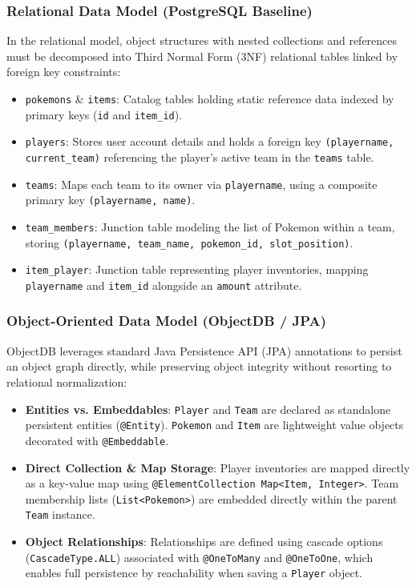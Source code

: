 \documentclass{article}
\begin{document}
\subsubsection{Relational Data Model (PostgreSQL Baseline)}
In the relational model, object structures with nested collections and references must be decomposed into Third Normal Form (3NF) relational tables linked by foreign key constraints:
\begin{itemize}
    \item \texttt{pokemons} \& \texttt{items}: Catalog tables holding static reference data indexed by primary keys (\texttt{id} and \texttt{item\_id}).
    \item \texttt{players}: Stores user account details and holds a foreign key \texttt{(playername, current\_team)} referencing the player's active team in the \texttt{teams} table.
    \item \texttt{teams}: Maps each team to its owner via \texttt{playername}, using a composite primary key \texttt{(playername, name)}.
    \item \texttt{team\_members}: Junction table modeling the list of Pokemon within a team, storing \texttt{(playername, team\_name, pokemon\_id, slot\_position)}.
    \item \texttt{item\_player}: Junction table representing player inventories, mapping \texttt{playername} and \texttt{item\_id} alongside an \texttt{amount} attribute.
\end{itemize}

\subsubsection{Object-Oriented Data Model (ObjectDB / JPA)}
ObjectDB leverages standard Java Persistence API (JPA) annotations to persist an object graph directly, while preserving object integrity without resorting to relational normalization:
\begin{itemize}
    \item \textbf{Entities vs. Embeddables}: \texttt{Player} and \texttt{Team} are declared as standalone persistent entities (\texttt{@Entity}). \texttt{Pokemon} and \texttt{Item} are lightweight value objects decorated with \texttt{@Embeddable}.
    \item \textbf{Direct Collection \& Map Storage}: Player inventories are mapped directly as a key-value map using \texttt{@ElementCollection Map<Item, Integer>}. Team membership lists (\texttt{List<Pokemon>}) are embedded directly within the parent \texttt{Team} instance.
    \item \textbf{Object Relationships}: Relationships are defined using cascade options (\texttt{CascadeType.ALL}) associated with \texttt{@OneToMany} and \texttt{@OneToOne}, which enables full persistence by reachability when saving a \texttt{Player} object.
\end{itemize}
\end{document}
